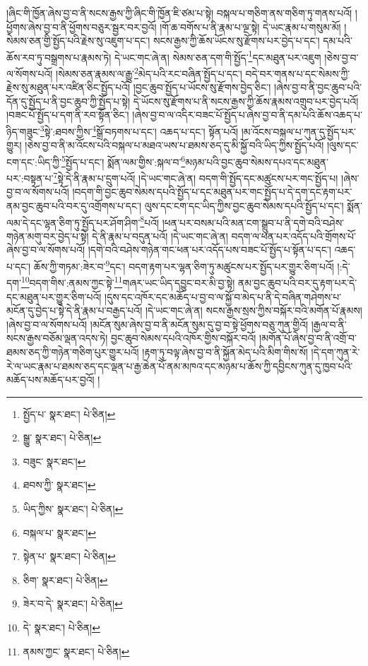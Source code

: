 །ཞིང་གི་ཁྱོན་ཞེས་བྱ་བ་ནི་སངས་རྒྱས་ཀྱི་ཞིང་གི་ཁྱོན་ཇི་ཙམ་པ་སྟེ། བསྐལ་པ་གཅིག་ནས་གཅིག་ཏུ་གནས་པའོ། །ཕྱོགས་ཞེས་བྱ་བ་ནི་ཕྱོགས་བཅུར་སྦྱར་བར་བྱའོ། །གོ་ཆ་བགོས་པ་ནི་རྣམ་པ་ལྔ་སྟེ། དེ་ཡང་རྣམ་པ་གསུམ་མོ། །སེམས་ཅན་གྱི་སྤྱོད་པའི་རྗེས་སུ་འཇུག་པ་དང་། སངས་རྒྱས་ཀྱི་ཆོས་ཡོངས་སུ་རྫོགས་པར་བྱེད་པ་དང་། དམ་པའི་ཆོས་རབ་ཏུ་བསྒྲགས་པ་རྣམས་ཏེ། དེ་ཡང་གང་ཞེ་ན། སེམས་ཅན་དག་གི་སྤྱོད་\footnote{སྤྱོད་པ་  སྣར་ཐང་།  པེ་ཅིན། }དང་མཐུན་པར་འཇུག །ཅེས་བྱ་བ་ལ་སོགས་པའོ། །སེམས་ཅན་རྣམས་ལ་རྒྱུ་\footnote{སྒྱུ་  སྣར་ཐང་།  པེ་ཅིན། }མེད་པའི་རང་བཞིན་སྤྱོད་པ་དང་། བདེ་བར་གནས་པ་དང་སེམས་ཀྱི་རྗེས་སུ་མཐུན་པར་འཛིན་ཅིང་སྤྱོད་པའོ། །བྱང་ཆུབ་སྤྱོད་པ་ཡོངས་སུ་རྫོགས་བྱེད་ཅིང་། །ཞེས་བྱ་བ་ནི་བྱང་ཆུབ་པའི་དོན་དུ་སྤྱོད་པ་ནི་བྱང་ཆུབ་ཀྱི་སྤྱོད་པ་སྟེ། དེ་ཡོངས་སུ་རྫོགས་པ་ནི་སངས་རྒྱས་ཀྱི་ཆོས་རྣམས་འགྲུབ་པར་བྱེད་པའོ། །བཟང་པོ་སྤྱོད་པ་དག་ནི་རབ་སྟོན་ཅིང་། །ཞེས་བྱ་བ་ལ་འདིར་བཟང་པོ་སྤྱོད་པ་ཞེས་བྱ་བ་ནི་དམ་པའི་ཆོས་འཆད་པ་ཉིད་གཟུང་\footnote{བཟུང་  སྣར་ཐང་། }སྟེ་:ཐབས་ཀྱིས་\footnote{ཐབས་ཀྱི་  སྣར་ཐང་། }སྒྲོ་བཏགས་པ་དང་། འཆད་པ་དང་། སྟོན་པའོ། །མ་འོངས་བསྐལ་པ་ཀུན་དུ་སྤྱོད་པར་གྱུར། །ཅེས་བྱ་བ་ནི་མ་འོངས་པའི་བསྐལ་པ་མཐའ་ཡས་པ་ཐམས་ཅད་དུ་མི་སྐྱོ་བའི་ཡིད་ཀྱིས་སྤྱོད་པའོ། །ལུས་དང་ངག་དང་:ཡིད་ཀྱི་\footnote{ཡིད་ཀྱིས་  སྣར་ཐང་།  པེ་ཅིན། }སྤྱོད་པ་དང་། སྨོན་ལམ་གྱིས་:སྐལ་བ་\footnote{བསྐལ་པ་  སྣར་ཐང་། }མཉམ་པའི་བྱང་ཆུབ་སེམས་དཔའ་དང་མཐུན་པར་:བསྟན་པ་\footnote{སྟེན་པ་  སྣར་ཐང་།  པེ་ཅིན། }སྟེ་དེ་ནི་རྣམ་པ་དྲུག་པའོ། །དེ་ཡང་གང་ཞེ་ན། བདག་གི་སྤྱོད་དང་མཚུངས་པར་གང་སྤྱོད་པ། །ཞེས་བྱ་བ་ལ་སོགས་པའོ། །བདག་གི་བྱང་ཆུབ་སེམས་དཔའི་སྤྱོད་པ་དང་མཐུན་པར་གང་སྤྱོད་པ་དེ་དག་དང་རྟག་པར་ནམ་བྱང་ཆུབ་པའི་བར་དུ་འགྲོགས་པ་དང་། ལུས་དང་ངག་དང་ཡིད་ཀྱིས་བྱང་ཆུབ་སེམས་དཔའི་སྤྱོད་པ་དང་། སྨོན་ལམ་དེ་དང་ལྷན་ཅིག་ཏུ་སྤྱོད་པར་ཤོག་ཤིག་\footnote{ཅིག་  སྣར་ཐང་།  པེ་ཅིན། }པའོ། །ཕན་པར་བསམ་པའི་མན་ངག་སྒྲུབ་པ་ནི་དགེ་བའི་བཤེས་གཉེན་མགུ་བར་བྱེད་པ་སྟེ། དེ་ནི་རྣམ་པ་བདུན་པའོ། །དེ་ཡང་གང་ཞེ་ན། བདག་ལ་ཕན་པར་འདོད་པའི་གྲོགས་པོ་ཞེས་བྱ་བ་ལ་སོགས་པའོ། །དགེ་བའི་བཤེས་གཉེན་གང་ཕན་པར་འདོད་པས་བཟང་པོ་སྤྱོད་པ་སྟོན་པ་དང་། འཆད་པ་དང་། ཆོས་ཀྱི་གཏམ་:ཟེར་བ་\footnote{ཟེར་བ་དེ་  སྣར་ཐང་།  པེ་ཅིན། }དང་། བདག་རྟག་པར་ལྷན་ཅིག་ཏུ་མཚུངས་པར་སྤྱོད་པར་གྱུར་ཅིག་པའོ། །:དེ་དག་\footnote{དེ་  སྣར་ཐང་།  པེ་ཅིན། }བདག་གིས་:ནམས་ཀྱང་སྟེ་\footnote{ནམས་ཀྱང་  སྣར་ཐང་།  པེ་ཅིན། }གཞར་ཡང་ཡིད་དབྱུང་བར་མི་བྱ་སྟེ། ནམ་བྱང་ཆུབ་པའི་བར་དུ་རྟག་པར་དེ་དང་མཐུན་པར་གྱུར་ཅིག་པའོ། །དུས་དང་འཁོར་དང་མཆོད་པ་བྱ་བ་ལ་སྐྱོ་བ་མེད་པ་ནི་དེ་བཞིན་གཤེགས་པ་མངོན་དུ་བྱེད་པ་སྟེ་དེ་ནི་རྣམ་པ་བརྒྱད་པའོ། །དེ་ཡང་གང་ཞེ་ན། སངས་རྒྱས་སྲས་ཀྱིས་བསྐོར་བའི་མགོན་པོ་རྣམས། །ཞེས་བྱ་བ་ལ་སོགས་པའོ། །མངོན་སུམ་ཞེས་བྱ་བ་ནི་མངོན་སུམ་དུ་བྱ་བ་སྟེ་ཕྱོགས་བཅུ་ཀུན་གྱིའོ། །རྒྱལ་བ་ནི་སངས་རྒྱས་བཅོམ་ལྡན་འདས་ཏེ། བྱང་ཆུབ་སེམས་དཔའི་འཁོར་གྱིས་བསྐོར་བའོ། །མགོན་པོ་ཞེས་བྱ་བ་ནི་འགྲོ་བ་ཐམས་ཅད་ཀྱི་གཉེན་གཅིག་པུར་གྱུར་པའོ། །རྟག་ཏུ་བལྟ་ཞེས་བྱ་བ་ནི་སྐྱོན་མེད་པའི་མིག་གིས་སོ། །དེ་དག་ཀུན་རེ་རེ་ལ་ཡང་རྣམ་པ་ཐམས་ཅད་དང་ལྡན་པ་རྒྱ་ཆེན་པོ་ནམ་མཁའ་དང་མཉམ་པ་ཆོས་ཀྱི་དབྱིངས་ཀུན་དུ་ཁྱབ་པའི་མཆོད་པས་མཆོད་པར་བྱའོ། །
